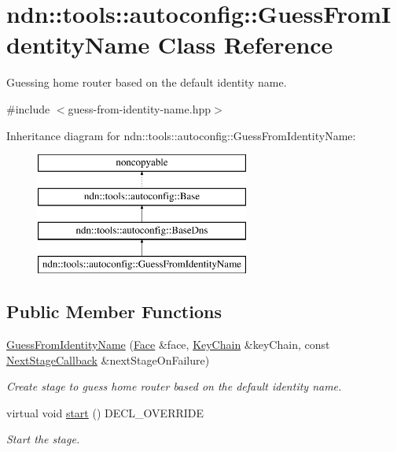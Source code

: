 \hypertarget{classndn_1_1tools_1_1autoconfig_1_1GuessFromIdentityName}{}\section{ndn\+:\+:tools\+:\+:autoconfig\+:\+:Guess\+From\+Identity\+Name Class Reference}
\label{classndn_1_1tools_1_1autoconfig_1_1GuessFromIdentityName}


Guessing home router based on the default identity name.  




{\ttfamily \#include $<$guess-\/from-\/identity-\/name.\+hpp$>$}

Inheritance diagram for ndn\+:\+:tools\+:\+:autoconfig\+:\+:Guess\+From\+Identity\+Name\+:\begin{figure}[H]
\begin{center}
\leavevmode
\includegraphics[height=4.000000cm]{classndn_1_1tools_1_1autoconfig_1_1GuessFromIdentityName}
\end{center}
\end{figure}
\subsection*{Public Member Functions}
\begin{DoxyCompactItemize}
\item 
\hyperlink{classndn_1_1tools_1_1autoconfig_1_1GuessFromIdentityName_ac40fd53be672b1718b05dd114256f3e2}{Guess\+From\+Identity\+Name} (\hyperlink{classndn_1_1Face}{Face} \&face, \hyperlink{classndn_1_1security_1_1KeyChain}{Key\+Chain} \&key\+Chain, const \hyperlink{classndn_1_1tools_1_1autoconfig_1_1Base_a1b9466e64370f1ead34b754096562445}{Next\+Stage\+Callback} \&next\+Stage\+On\+Failure)
\begin{DoxyCompactList}\small\item\em Create stage to guess home router based on the default identity name. \end{DoxyCompactList}\item 
virtual void \hyperlink{classndn_1_1tools_1_1autoconfig_1_1GuessFromIdentityName_a747b10b68d24d045a773814d12f1f031}{start} () D\+E\+C\+L\+\_\+\+O\+V\+E\+R\+R\+I\+DE\hypertarget{classndn_1_1tools_1_1autoconfig_1_1GuessFromIdentityName_a747b10b68d24d045a773814d12f1f031}{}\label{classndn_1_1tools_1_1autoconfig_1_1GuessFromIdentityName_a747b10b68d24d045a773814d12f1f031}

\begin{DoxyCompactList}\small\item\em Start the stage. \end{DoxyCompactList}\end{DoxyCompactItemize}
